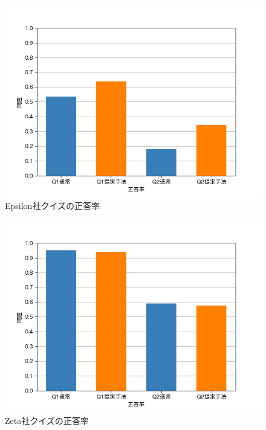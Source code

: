 \begin{figure}[h]
  \begin{center}
      \includegraphics[width=13cm]{img/qgraphEpsilon.png}
      \caption{Epsilon社クイズの正答率}
      \label{img:Epsilon社クイズの正答率}
  \end{center}
\end{figure}
\begin{figure}[h]
  \begin{center}
      \includegraphics[width=13cm]{img/qgraphZeta.png}
      \caption{Zeta社クイズの正答率}
      \label{img:Zeta社クイズの正答率}
  \end{center}
\end{figure}
